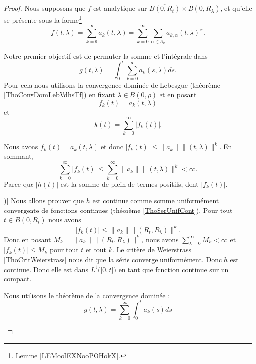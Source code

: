 \begin{proof}
	Nous supposons que \( f\) est analytique sur \( \overline{B(0,R_t)}\times \overline{B(0,R_{\lambda})}\), et qu'elle se présente sous la forme\footnote{Lemme \ref{LEMooIEXNooPOHokX}.}
	\begin{equation}
		f(t,\lambda) =\sum_{k=0}^{\infty}a_k(t,\lambda)  =\sum_{k=0}^{\infty}\sum_{\alpha\in \Lambda_k}a_{k,\alpha}(t,\lambda)^{\alpha}.
	\end{equation}
	\begin{subproof}
		Notre premier objectif est de permuter la somme et l'intégrale dans
		\begin{equation}
			g(t,\lambda)=\int_{0}^t\sum_{k=0}^{\infty}a_k(s,\lambda)ds.
		\end{equation}
		Pour cela nous utilisons la convergence dominée de Lebesgue (théorème \ref{ThoConvDomLebVdhsTf}) en fixant \( \lambda\in B(0,\rho)\) et en posant
		\begin{equation}
			f_k(t)=a_k(t,\lambda)
		\end{equation}
		et
		\begin{equation}
			h(t)=\sum_{k=0}^{\infty}| f_k(t) |.
		\end{equation}
		\begin{subproof}
			\spitem[\( h(t)<\infty\)]
			Nous avons \( f_k(t)=a_k(t,\lambda)\) et donc \( | f_k(t) |\leq \| a_k \|\| (t,\lambda) \|^k\). En sommant,
			\begin{equation}
				\sum_{k=0}^{\infty}| f_k(t) |\leq \sum_{k=0}^{\infty}\| a_k \|\| (t,\lambda) \|^k<\infty.
			\end{equation}
			\spitem[\( | f_k(t) |\leq | h(t) |\)]
			Parce que \( | h(t) |\) est la somme de plein de termes positifs, dont \( | f_k(t) |\).

			\spitem[\( h\in L^1\big( \mathopen[ 0,t\mathclose] \big)\)]
			Nous allons prouver que \( h\) est continue comme somme uniformément convergente de fonctions continues (théorème \ref{ThoSerUnifCont}). Pour tout \( t\in B(0,R_t)\) nous avons
			\begin{equation}
				| f_k(t) |\leq \| a_k \|\| (R_t,R_{\lambda}) \|^k.
			\end{equation}
			Donc en posant \( M_k= \| a_k \|\| (R_t,R_{\lambda}) \|^k\), nous avons \( \sum_{k=0}^{\infty}M_k<\infty\) et \( | f_k(t) |\leq M_k\) pour tout \( t\) et tout \( k\). Le critère de Weierstrass \ref{ThoCritWeierstrass} nous dit que la série converge uniformément. Donc \( h\) est continue. Donc elle est dans \( L^1\big( \mathopen[ 0,t\mathclose] \big)\) en tant que fonction continue sur un compact.
		\end{subproof}
		Nous utilisons le théorème de la convergence dominée :
		\begin{equation}
			g(t,\lambda)=\sum_{k=0}^{\infty}\int_0^ta_k(s)ds
		\end{equation}


\end{subproof}
\end{proof}
